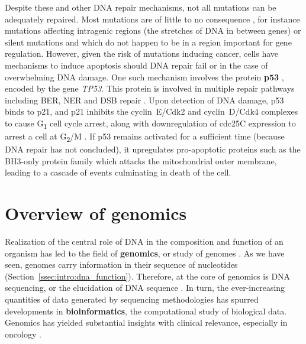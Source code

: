 Despite these and other DNA repair mechanisms, not all mutations can be adequately repaired. Most mutations are of little to no consequence \cite{nei2010}, for instance mutations affecting intragenic regions (the stretches of DNA in between genes) or silent mutations and which do not happen to be in a region important for gene regulation. However, given the risk of mutations inducing cancer, cells have mechanisms to induce apoptosis should DNA repair fail or in the case of overwhelming DNA damage. One such mechanism involves the protein \textbf{p53} \cite{schlereth2010}, encoded by the gene \textit{TP53}. This protein is involved in multiple repair pathways including BER, NER and DSB repair \cite{offer2002}. Upon detection of DNA damage, p53 binds to p21, and p21 inhibits the cyclin~E/Cdk2 and cyclin~D/Cdk4 complexes to cause G\textsubscript{1} cell cycle arrest, along with downregulation of cdc25C expression to arrest a cell at G\textsubscript{2}/M \cite{chen2016}. If p53 remains activated for a sufficient time (because DNA repair has not concluded), it upregulates pro-apoptotic proteins such as the BH3-only protein family which attacks the mitochondrial outer membrane, leading to a cascade of events culminating in death of the cell.

\section{Overview of genomics}
\label{sec:intro:genomics}
Realization of the central role of DNA in the composition and function of an organism has led to the field of \textbf{genomics}, or study of genomes \cite{delgiacco2012}. As we have seen, genomes carry information in their sequence of nucleotides (Section~\ref{ssec:intro:dna_function}). Therefore, at the core of genomics is DNA sequencing, or the elucidation of DNA sequence \cite{weissenbach2016}. In turn, the ever-increasing quantities of data generated by sequencing methodologies has spurred developments in \textbf{bioinformatics}, the computational study of biological data. Genomics has yielded substantial insights with clinical relevance, especially in oncology \cite{shendure2019}.

